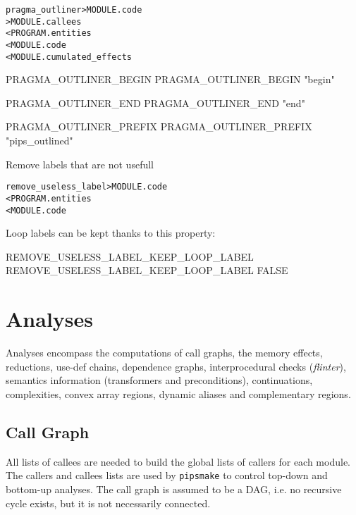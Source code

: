 \documentclass[a4paper]{report}
\newenvironment{PipsMake}{\begin{alltt}}{\end{alltt}}
\newenvironment{PipsPass}[1]{\label{pass:#1}}{}
\newcommand{\Pipsmake}{\texttt{pipsmake}}
\begin{document}
\begin{PipsMake}
pragma_outliner      >     MODULE.code
    > MODULE.callees
    < PROGRAM.entities
    < MODULE.code
    < MODULE.cumulated_effects
\end{PipsMake}

\begin{PipsProp}{PRAGMA_OUTLINER_BEGIN}
PRAGMA_OUTLINER_BEGIN "begin"
\end{PipsProp}
\begin{PipsProp}{PRAGMA_OUTLINER_END}
PRAGMA_OUTLINER_END "end"
\end{PipsProp}
\begin{PipsProp}{PRAGMA_OUTLINER_PREFIX}
PRAGMA_OUTLINER_PREFIX "pips_outlined"
\end{PipsProp}




\begin{PipsPass}{remove_useless_label}
Remove labels that are not usefull
\end{PipsPass}
\begin{PipsMake}
remove_useless_label > MODULE.code
  < PROGRAM.entities
  < MODULE.code
\end{PipsMake}

Loop labels can be kept thanks to this property:
\begin{PipsProp}{REMOVE_USELESS_LABEL_KEEP_LOOP_LABEL}
REMOVE_USELESS_LABEL_KEEP_LOOP_LABEL FALSE
\end{PipsProp}




\chapter{Analyses}
\label{section-analyses}

Analyses encompass the computations of call graphs, the memory effects,
reductions, use-def chains, dependence graphs, interprocedural checks
({\em flinter}), semantics information (transformers and preconditions),
continuations, complexities, convex array regions, dynamic aliases and
complementary regions.

\section{Call Graph}
\label{subsection-call-graph}

All lists of callees are needed to build the global lists of callers
for each module. The callers and callees lists are used by \Pipsmake{}
to control top-down and bottom-up analyses. The call graph is
assumed to be a DAG, i.e. no recursive cycle exists, but it is not
necessarily connected.
\end{document}
